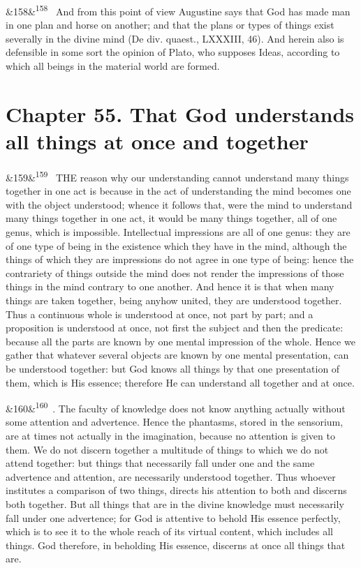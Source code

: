 \documentclass[12pt]{article}
\newcommand{\para}[1][]{\par\noindent\ifx&#1&\else\textsuperscript{\footnotesize #1}~\fi}
\begin{document}
\para[158] And from this point of view Augustine says that God has made man in one plan and horse on another; and that the plans or types of things exist severally in the divine mind (De div. quaest., LXXXIII, 46). And herein also is defensible in some sort the opinion of Plato, who supposes Ideas, according to which all beings in the material world are formed.

\section*{Chapter 55. That God understands all things at once and together}

\para[159] THE reason why our understanding cannot understand many things together in one act is because in the act of understanding the mind becomes one with the object understood; whence it follows that, were the mind to understand many things together in one act, it would be many things together, all of one genus, which is impossible. Intellectual impressions are all of one genus: they are of one type of being in the existence which they have in the mind, although the things of which they are impressions do not agree in one type of being: hence the contrariety of things outside the mind does not render the impressions of those things in the mind contrary to one another. And hence it is that when many things are taken together, being anyhow united, they are understood together. Thus a continuous whole is understood at once, not part by part; and a proposition is understood at once, not first the subject and then the predicate: because all the parts are known by one mental impression of the whole. Hence we gather that whatever several objects are known by one mental presentation, can be understood together: but God knows all things by that one presentation of them, which is His essence; therefore He can understand all together and at once.

\para[160] 2. The faculty of knowledge does not know anything actually without some attention and advertence. Hence the phantasms, stored in the sensorium, are at times not actually in the imagination, because no attention is given to them. We do not discern together a multitude of things to which we do not attend together: but things that necessarily fall under one and the same advertence and attention, are necessarily understood together. Thus whoever institutes a comparison of two things, directs his attention to both and discerns both together. But all things that are in the divine knowledge must necessarily fall under one advertence; for God is attentive to behold His essence perfectly, which is to see it to the whole reach of its virtual content, which includes all things. God therefore, in beholding His essence, discerns at once all things that are.
\end{document}
